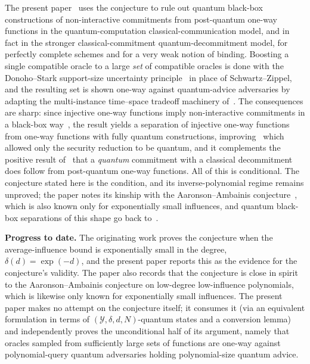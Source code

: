 \documentclass{aicr-conjecture}
\newcommand{\cY}{\mathcal{Y}}
\begin{document}
The present paper~\cite{CLM23} uses the conjecture to rule out quantum
black-box constructions of non-interactive commitments from post-quantum
one-way functions in the quantum-computation classical-communication
model, and in fact in the stronger classical-commitment
quantum-decommitment model, for perfectly complete schemes and for a very
weak notion of binding. Boosting a single compatible oracle to a large
\emph{set} of compatible oracles is done with the Donoho--Stark
support-size uncertainty principle~\cite{DS89} in place of
Schwartz--Zippel, and the resulting set is shown one-way against
quantum-advice adversaries by adapting the multi-instance time--space
tradeoff machinery of~\cite{CGLQ20}. The consequences are sharp: since
injective one-way functions imply non-interactive commitments in a
black-box way~\cite{GL89}, the result yields a separation of injective
one-way functions from one-way functions with fully quantum
constructions, improving~\cite{CX21} which allowed only the security
reduction to be quantum, and it complements the positive result
of~\cite{BB21} that a \emph{quantum} commitment with a classical
decommitment does follow from post-quantum one-way functions. All of this
is conditional. The conjecture stated here is the condition, and its
inverse-polynomial regime remains unproved; the paper notes its kinship
with the Aaronson--Ambainis conjecture~\cite{AA09}, which is also known
only for exponentially small influences, and quantum black-box
separations of this shape go back to~\cite{HY20}.

\textbf{Progress to date.} The originating work proves the conjecture
when the average-influence bound is exponentially small in the degree,
$\delta(d) = \exp(-d)$, and the present paper reports this as the
evidence for the conjecture's validity. The paper also records that the
conjecture is close in spirit to the Aaronson--Ambainis conjecture on
low-degree low-influence polynomials, which is likewise only known for
exponentially small influences. The present paper makes no attempt on the
conjecture itself; it consumes it (via an equivalent formulation in terms
of $(\cY,\delta,d,N)$-quantum states and a conversion lemma) and
independently proves the unconditional half of its argument, namely that
oracles sampled from sufficiently large sets of functions are one-way
against polynomial-query quantum adversaries holding polynomial-size
quantum advice.
\end{document}
